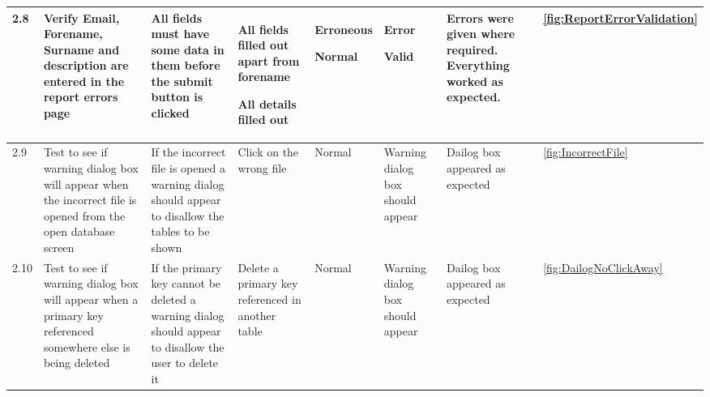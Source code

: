 \begin{landscape}
\begin{center}
\begin{longtable}{|p{1.5cm}|p{2cm}|p{2.5cm}|p{2cm}|p{2cm}|p{2cm}|p{3cm}|p{1.7cm}|}
2.8 & Verify Email, Forename, Surname and description are entered in the report errors page & All fields must have some data in them before the submit  button is clicked & All fields filled out apart from forename \par \bigskip All details filled out & Erroneous \par \bigskip \bigskip Normal & Error \par \bigskip \bigskip Valid &Errors were given where required. Everything worked as expected.&\ref {fig:ReportErrorValidation}  \\ \hline
\rowcolor{lightgray}2.9 & Test to see if warning dialog box will appear when the incorrect file is opened from the open database screen & If the incorrect file is opened a warning dialog should appear to disallow the tables to be shown & Click on the wrong file & Normal &Warning dialog box should appear &Dailog box appeared as expected& \ref {fig:IncorrectFile}  \\ \hline
\rowcolor{lightgray}2.10& Test to see if warning dialog box will appear when a primary key referenced somewhere else is being deleted & If the primary key cannot be deleted a warning dialog should appear to disallow the user to delete it & Delete a primary key referenced in another table & Normal &Warning dialog box should appear &Dailog box appeared as expected&\ref {fig:DailogNoClickAway} \\ \hline



\end{longtable}
\end{center}
\end{landscape}
